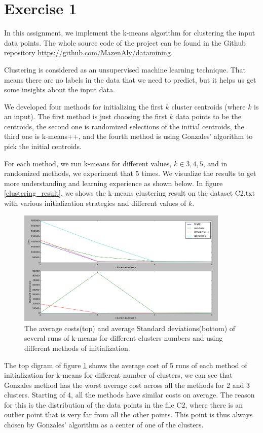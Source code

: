 \section*{Exercise 1}
In this assignment, we implement the k-means algorithm for clustering the input data points. The whole source code of the project can be found in the Github repository \url{https://github.com/MazenAly/datamining}.

Clustering is considered as an unsupervised machine learning technique. That means there are no labels in the data that we need to predict, but it helps us get some insights about the input data.

We developed four methods for initializing the first $k$ cluster centroids (where $k$ is an input).
The first method is just choosing the first $k$ data points to be the centroids, the second one is randomized selections of the initial centroids, the third one is k-means++,
and the fourth method is using Gonzales’ algorithm to pick the initial centroids.

For each method, we run k-means for different values, $k \in {3,4,5}$, and in randomized methods, we experiment that 5 times. We visualize the results to get more understanding and learning experience as shown below. In figure \ref{clustering_result}, we shows the k-means clustering result on the dataset C2.txt with various initialization strategies and different values of $k$.

\begin{figure}[!htb]
\centering
\includegraphics[width=0.9\textwidth]{shots/std_mean.png}
\caption{The average costs(top) and average Standard deviations(bottom) of several runs of k-means for different clusters numbers and using different methods of initialization.}
\label{std_mean}
\end{figure}

The top digram of figure \ref{std_mean} shows the average cost of 5 runs of each method of initialization for k-means for different number of clusters, we can see that Gonzales method has the worst average cost across all the methods for 2 and 3 clusters. Starting of 4, all the methods have similar costs on average. The reason for this is the distribution of the data points in the file C2, where there is an outlier point that is very far from all the other points. This point is thus always chosen by Gonzales' algorithm as a center of one of the clusters.

